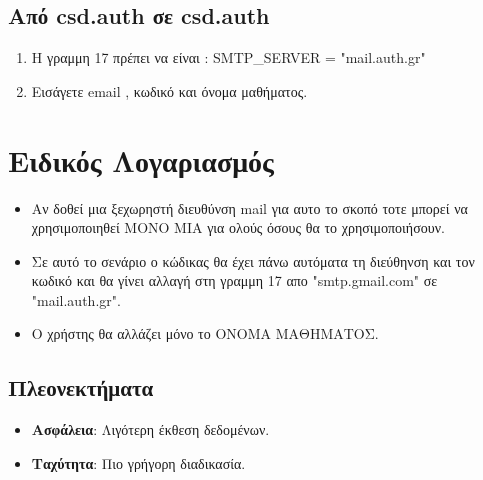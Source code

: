 \documentclass[a4paper,12pt]{article}
\begin{document}
\subsection{Από  csd.auth  σε  csd.auth }
\begin{enumerate}
    \item Η γραμμη 17 πρέπει να είναι : SMTP\_SERVER = "mail.auth.gr" 
    \item Εισάγετε  email , κωδικό και όνομα μαθήματος.
\end{enumerate}

\section{Ειδικός Λογαριασμός}
\begin{itemize}
    \item Αν δοθεί μια ξεχωρηστή διευθύνση mail για αυτο το σκοπό τοτε μπορεί να χρησιμοποιηθεί ΜΟΝΟ ΜΙΑ για ολούς όσους θα το χρησιμοποιήσουν.
    \item Σε αυτό το σενάριο ο κώδικας θα έχει πάνω αυτόματα τη διεύθηνση και τον κωδικό και θα γίνει αλλαγή στη γραμμη 17 απο "smtp.gmail.com" σε "mail.auth.gr".
    \item Ο χρήστης θα αλλάζει μόνο το ΟΝΟΜΑ ΜΑΘΗΜΑΤΟΣ.
	
\end{itemize}

\subsection{Πλεονεκτήματα}
\begin{itemize}
    \item \textbf{Ασφάλεια}: Λιγότερη έκθεση δεδομένων.
    \item \textbf{Ταχύτητα}: Πιο γρήγορη διαδικασία.
\end{itemize}
\end{document}
